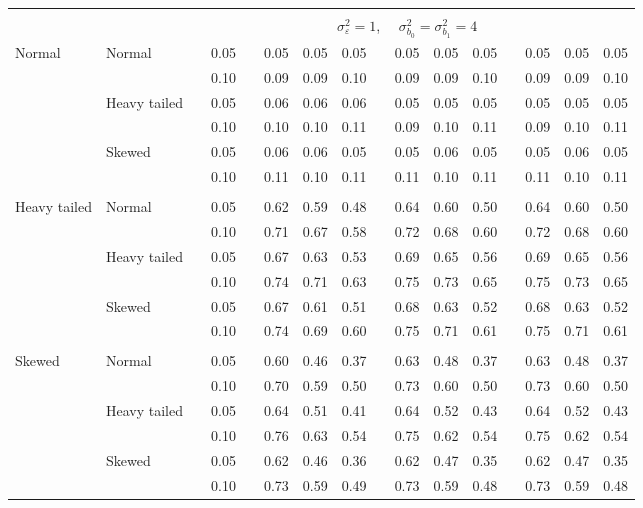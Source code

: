 \documentclass{article} %
\begin{document}
\begin{table}[ht]
\begin{scriptsize}
\begin{center}
\begin{tabular}{ll p{.1cm} c p{.1cm} rrr p{.1cm} rrr p{.1cm} rrr}
&&&&&&&&&&&&&&&\\
& && && \multicolumn{9}{c}{$\sigma_{\varepsilon}^2 = 1$, \ \ $\sigma_{b_0}^2 = \sigma_{b_1}^2 = 4$} \\ \cline{6-16}
\rowcolor{gray!20}Normal       & Normal       && 0.05 &&   0.05 & 0.05 & 0.05 && 0.05 & 0.05 & 0.05 && 0.05 & 0.05 & 0.05 \\ 
\rowcolor{gray!20}             &              && 0.10 &&   0.09 & 0.09 & 0.10 && 0.09 & 0.09 & 0.10 && 0.09 & 0.09 & 0.10 \\ 
\rowcolor{gray!20}             & Heavy tailed && 0.05 &&   0.06 & 0.06 & 0.06 && 0.05 & 0.05 & 0.05 && 0.05 & 0.05 & 0.05 \\ 
\rowcolor{gray!20}             &              && 0.10 &&   0.10 & 0.10 & 0.11 && 0.09 & 0.10 & 0.11 && 0.09 & 0.10 & 0.11 \\ 
\rowcolor{gray!20}             & Skewed       && 0.05 &&   0.06 & 0.06 & 0.05 && 0.05 & 0.06 & 0.05 && 0.05 & 0.06 & 0.05 \\ 
\rowcolor{gray!20}             &              && 0.10 &&   0.11 & 0.10 & 0.11 && 0.11 & 0.10 & 0.11 && 0.11 & 0.10 & 0.11 \\ 
             &&&&&&&&&&&&&&&\\
Heavy tailed & Normal       && 0.05 &&   0.62 & 0.59 & 0.48 && 0.64 & 0.60 & 0.50 && 0.64 & 0.60 & 0.50 \\ 
             &              && 0.10 &&   0.71 & 0.67 & 0.58 && 0.72 & 0.68 & 0.60 && 0.72 & 0.68 & 0.60 \\ 
             & Heavy tailed && 0.05 &&   0.67 & 0.63 & 0.53 && 0.69 & 0.65 & 0.56 && 0.69 & 0.65 & 0.56 \\ 
             &              && 0.10 &&   0.74 & 0.71 & 0.63 && 0.75 & 0.73 & 0.65 && 0.75 & 0.73 & 0.65 \\ 
             & Skewed       && 0.05 &&   0.67 & 0.61 & 0.51 && 0.68 & 0.63 & 0.52 && 0.68 & 0.63 & 0.52 \\ 
             &              && 0.10 &&   0.74 & 0.69 & 0.60 && 0.75 & 0.71 & 0.61 && 0.75 & 0.71 & 0.61 \\
             &&&&&&&&&&&&&&&\\ 
Skewed       & Normal       && 0.05 &&   0.60 & 0.46 & 0.37 && 0.63 & 0.48 & 0.37 && 0.63 & 0.48 & 0.37 \\ 
             &              && 0.10 &&   0.70 & 0.59 & 0.50 && 0.73 & 0.60 & 0.50 && 0.73 & 0.60 & 0.50 \\ 
             & Heavy tailed && 0.05 &&   0.64 & 0.51 & 0.41 && 0.64 & 0.52 & 0.43 && 0.64 & 0.52 & 0.43 \\ 
             &              && 0.10 &&   0.76 & 0.63 & 0.54 && 0.75 & 0.62 & 0.54 && 0.75 & 0.62 & 0.54 \\ 
             & Skewed       && 0.05 &&   0.62 & 0.46 & 0.36 && 0.62 & 0.47 & 0.35 && 0.62 & 0.47 & 0.35 \\ 
             &              && 0.10 &&   0.73 & 0.59 & 0.49 && 0.73 & 0.59 & 0.48 && 0.73 & 0.59 & 0.48 \\ 



\end{tabular}
\end{center}
\end{scriptsize}
\end{table}
\end{document}
